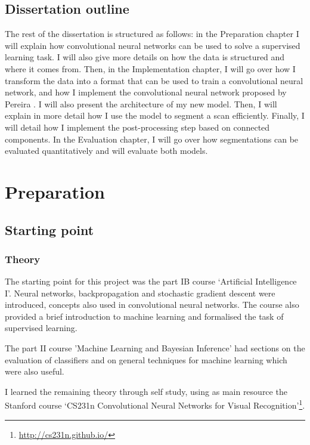 \documentclass[12pt,a4paper,twoside,openright]{report}
\begin{document}
\section{Dissertation outline}
The rest of the dissertation is structured as follows: in the Preparation chapter I will explain how convolutional neural networks can be used to solve a supervised learning task. I will also give more details on how the data is structured and where it comes from. Then, in the Implementation chapter, I will go over how I transform the data into a format that can be used to train a convolutional neural network, and how I implement the convolutional neural network proposed by Pereira \cite{pereira}. I will also present the architecture of my new model. Then, I will explain in more detail how I use the model to segment a scan efficiently. Finally, I will detail how I implement the post-processing step based on connected components. In the Evaluation chapter, I will go over how segmentations can be evaluated quantitatively and will evaluate both models.

\chapter{Preparation}

\section{Starting point}
\subsection{Theory}
The starting point for this project was the part IB course `Artificial Intelligence I'. Neural networks, backpropagation and stochastic gradient descent were introduced, concepts also used in convolutional neural networks. The course also provided a brief introduction to machine learning and formalised the task of supervised learning.

The part II course 'Machine Learning and Bayesian Inference' had sections on the evaluation of classifiers and on general techniques for machine learning which were also useful.

I learned the remaining theory through self study, using as main resource the Stanford course `CS231n Convolutional Neural Networks for Visual Recognition'\footnote{\url{http://cs231n.github.io/}}.
\end{document}
